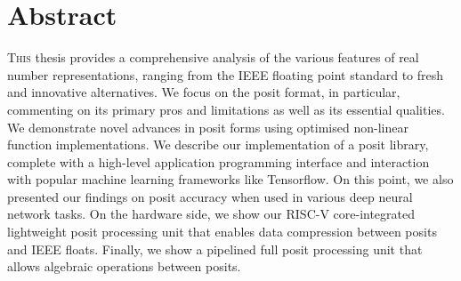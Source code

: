 \chapter*{Abstract}
\lettrine{T}{his} thesis provides a comprehensive analysis of the various features of real number representations, ranging from the IEEE floating point standard to fresh and innovative alternatives. We focus on the posit format, in particular, commenting on its primary pros and limitations as well as its essential qualities. We demonstrate novel advances in posit forms using optimised non-linear function implementations. We describe our implementation of a posit library, complete with a high-level application programming interface and interaction with popular machine learning frameworks like Tensorflow. On this point, we also presented our findings on posit accuracy when used in various deep neural network tasks.
On the hardware side, we show our RISC-V core-integrated lightweight posit processing unit that enables data compression between posits and IEEE floats. Finally, we show a pipelined full posit processing unit that allows algebraic operations between posits.
